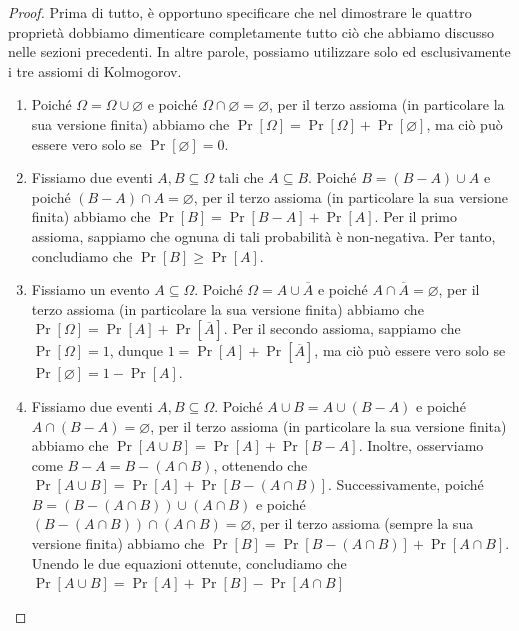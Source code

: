 \documentclass[a4paper, 12pt]{report}
\begin{document}
    \begin{proof}
        Prima di tutto, è opportuno specificare che nel dimostrare le quattro proprietà dobbiamo dimenticare completamente tutto ciò che abbiamo discusso nelle sezioni precedenti. In altre parole, possiamo utilizzare solo ed esclusivamente i tre assiomi di Kolmogorov.

        \begin{enumerate}
            \item Poiché $\Omega = \Omega \cup \varnothing$ e poiché $\Omega \cap \varnothing = \varnothing$, per il terzo assioma (in particolare la sua versione finita) abbiamo che $\Pr[\Omega] = \Pr[\Omega] + \Pr[\varnothing]$, ma ciò può essere vero solo se $\Pr[\varnothing] = 0$.
            
            \item Fissiamo due eventi $A,B \subseteq \Omega$ tali che $A \subseteq B$. Poiché $B = (B-A) \cup A$ e poiché $(B-A) \cap A = \varnothing$, per il terzo assioma (in particolare la sua versione finita) abbiamo che $\Pr[B] = \Pr[B-A] + \Pr[A]$. Per il primo assioma, sappiamo che ognuna di tali probabilità è non-negativa. Per tanto, concludiamo che $\Pr[B] \geq \Pr[A]$.

            
            \item Fissiamo un evento $A \subseteq \Omega$. Poiché $\Omega = A \cup \overline{A}$ e poiché $A \cap \overline{A} = \varnothing$, per il terzo assioma (in particolare la sua versione finita) abbiamo che $\Pr[\Omega] = \Pr[A] + \Pr[\overline{A}]$. Per il secondo assioma, sappiamo che $\Pr[\Omega] = 1$, dunque $1 = \Pr[A] + \Pr[\overline{A}]$, ma ciò può essere vero solo se $\Pr[\varnothing] = 1- \Pr[A]$.
            
            \item Fissiamo due eventi $A,B \subseteq \Omega$. Poiché $A \cup B = A \cup (B - A)$ e poiché $A \cap (B - A) = \varnothing$, per il terzo assioma (in particolare la sua versione finita) abbiamo che $\Pr[A \cup B] = \Pr[A] + \Pr[B-A]$. Inoltre, osserviamo come $B-A = B-(A \cap B)$, ottenendo che $\Pr[A \cup B] = \Pr[A] + \Pr[B-(A \cap B)]$. Successivamente, poiché $B = (B-(A \cap B)) \cup (A \cap B)$ e poiché $(B-(A \cap B)) \cap (A \cap B) = \varnothing$, per il terzo assioma (sempre la sua versione finita) abbiamo che $\Pr[B] = \Pr[B-(A \cap B)] + \Pr[A \cap B]$. Unendo le due equazioni ottenute, concludiamo che $\Pr[A \cup B] = \Pr[A] + \Pr[B] - \Pr[A \cap B]$
        \end{enumerate}
    \end{proof}
\end{document}
